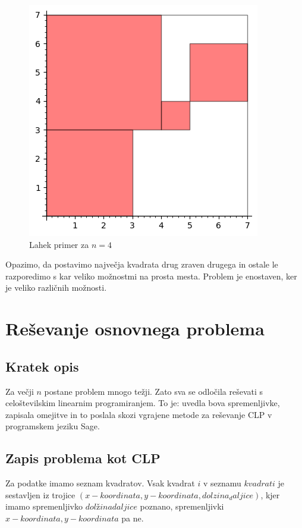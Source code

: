 \documentclass[a4paper, 11pt]{article}
\begin{document}
\begin{figure}[H]
    \centering
    \includegraphics{prvi.png}
    \caption{Lahek primer za $n = 4$}
\end{figure}

Opazimo, da postavimo največja kvadrata drug zraven drugega in ostale le razporedimo s kar
veliko možnostmi na prosta mesta. Problem je enostaven, ker je veliko različnih možnosti.

\section{Reševanje osnovnega problema}
\subsection{Kratek opis}
Za večji $n$ postane problem mnogo težji. Zato sva se odločila reševati s celoštevilskim linearnim programiranjem.
To je: uvedla bova spremenljivke, zapisala omejitve in to poslala skozi vgrajene 
metode za reševanje CLP v programskem jeziku Sage.
\subsection{Zapis problema kot CLP}\label{osnovni CLP}
Za podatke imamo seznam kvadratov. Vsak kvadrat $i$ v seznamu $kvadrati$ je sestavljen
iz trojice $(x-koordinata,y-koordinata,dolzina_daljice)$, kjer imamo spremenljivko $dolžina daljice$
poznano, spremenljivki $x-koordinata,y-koordinata$ pa ne.
\end{document}
